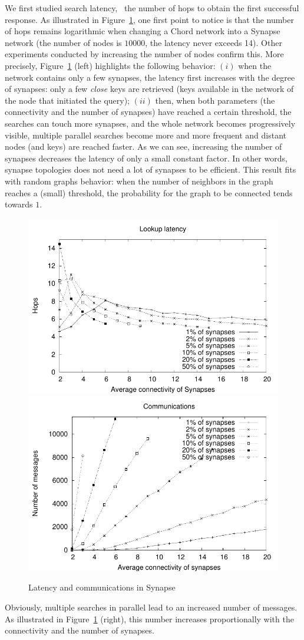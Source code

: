 We first studied search latency, \ie\ the number of hops to obtain the
first successful response.
As illustrated in Figure~\ref{fig:3D-hops}, one first point to notice
is that the number of hops remains logarithmic when changing a Chord
network into a Synapse network (the number of nodes is $10000$, the
latency never exceeds 14). Other experiments conducted by increasing
the number of nodes confirm this. More precisely,
Figure~\ref{fig:3D-hops} (left) highlights the following behavior:
$(i)$ when the network contains only a few synapses, the latency first
increases with the degree of synapses: only a few \emph{close} keys
are retrieved (keys available in the network of the node that
initiated the query); $(ii)$ then, when both parameters (the
connectivity and the number of synapses) have reached a certain
threshold, the searches can touch more synapses, and the whole network
becomes progressively visible, multiple parallel searches become more
and more frequent and distant nodes (and keys) are reached faster. As
we can see, increasing the number of synapses decreases the latency of
only a small constant factor. In other words, synapse topologies does
not need a lot of synapses to be efficient. This result fits with
random graphs behavior: when the number of neighbors in the graph
reaches a (small) threshold, the probability for the graph to be
connected tends towards $1$.
% 
\begin{figure}[!t]
        \includegraphics[width=0.5\linewidth]{fig/3D-hops.pdf}
        \includegraphics[width=0.5\linewidth]{fig/3D-msgs.pdf}
        \caption{Latency and communications in Synapse\label{fig:3D-hops}}
\end{figure}
%
Obviously, multiple searches in parallel lead to an increased number
of messages. As illustrated in Figure~\ref{fig:3D-hops} (right), this
number increases proportionally with the connectivity and the number
of synapses. 

